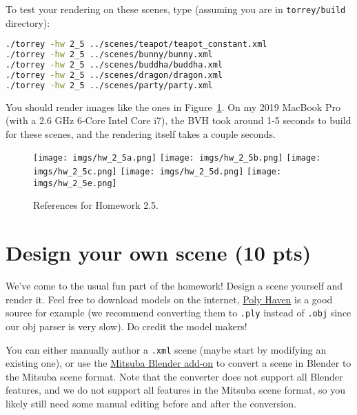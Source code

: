 To test your rendering on these scenes, type (assuming you are in \lstinline{torrey/build} directory):
\begin{lstlisting}[language=bash]
./torrey -hw 2_5 ../scenes/teapot/teapot_constant.xml
./torrey -hw 2_5 ../scenes/bunny/bunny.xml
./torrey -hw 2_5 ../scenes/buddha/buddha.xml
./torrey -hw 2_5 ../scenes/dragon/dragon.xml
./torrey -hw 2_5 ../scenes/party/party.xml
\end{lstlisting}

You should render images like the ones in Figure~\ref{fig:hw_2_5}. On my 2019 MacBook Pro (with a 2.6 GHz 6-Core Intel Core i7), the BVH took around 1-5 seconds to build for these scenes, and the rendering itself takes a couple seconds.
\begin{figure}[ht]
    \centering
    \texttt{[image: imgs/hw\_2\_5a.png]}
    \texttt{[image: imgs/hw\_2\_5b.png]}
    \texttt{[image: imgs/hw\_2\_5c.png]}
    \texttt{[image: imgs/hw\_2\_5d.png]}
    \texttt{[image: imgs/hw\_2\_5e.png]}
    \caption{References for Homework 2.5.}
    \label{fig:hw_2_5}
\end{figure}

\section{Design your own scene (10 pts)}
We've come to the usual fun part of the homework! Design a scene yourself and render it. Feel free to download models on the internet, \href{https://polyhaven.com/models}{Poly Haven} is a good source for example (we recommend converting them to \lstinline{.ply} instead of \lstinline{.obj} since our obj parser is very slow). Do credit the model makers!

You can either manually author a \lstinline{.xml} scene (maybe start by modifying an existing one), or use the \href{https://github.com/mitsuba-renderer/mitsuba-blender}{Mitsuba Blender add-on} to convert a scene in Blender to the Mitsuba scene format. Note that the converter does not support all Blender features, and we do not support all features in the Mitsuba scene format, so you likely still need some manual editing before and after the conversion.

